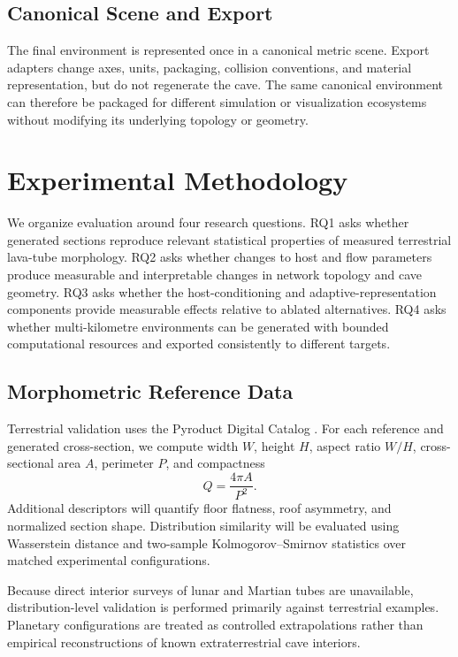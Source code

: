 \documentclass[conference]{IEEEtran}
\begin{document}
\subsection{Canonical Scene and Export}

The final environment is represented once in a canonical metric scene. Export adapters change axes, units, packaging, collision conventions, and material representation, but do not regenerate the cave. The same canonical environment can therefore be packaged for different simulation or visualization ecosystems without modifying its underlying topology or geometry.

\section{Experimental Methodology}
\label{sec:experiments}

We organize evaluation around four research questions. RQ1 asks whether generated sections reproduce relevant statistical properties of measured terrestrial lava-tube morphology. RQ2 asks whether changes to host and flow parameters produce measurable and interpretable changes in network topology and cave geometry. RQ3 asks whether the host-conditioning and adaptive-representation components provide measurable effects relative to ablated alternatives. RQ4 asks whether multi-kilometre environments can be generated with bounded computational resources and exported consistently to different targets.

\subsection{Morphometric Reference Data}

Terrestrial validation uses the Pyroduct Digital Catalog \cite{pdc2025}. For each reference and generated cross-section, we compute width $W$, height $H$, aspect ratio $W/H$, cross-sectional area $A$, perimeter $P$, and compactness
\begin{equation}
Q=\frac{4\pi A}{P^2}.
\label{eq:compactness}
\end{equation}
Additional descriptors will quantify floor flatness, roof asymmetry, and normalized section shape. Distribution similarity will be evaluated using Wasserstein distance and two-sample Kolmogorov--Smirnov statistics over matched experimental configurations.

Because direct interior surveys of lunar and Martian tubes are unavailable, distribution-level validation is performed primarily against terrestrial examples. Planetary configurations are treated as controlled extrapolations rather than empirical reconstructions of known extraterrestrial cave interiors.
\end{document}
